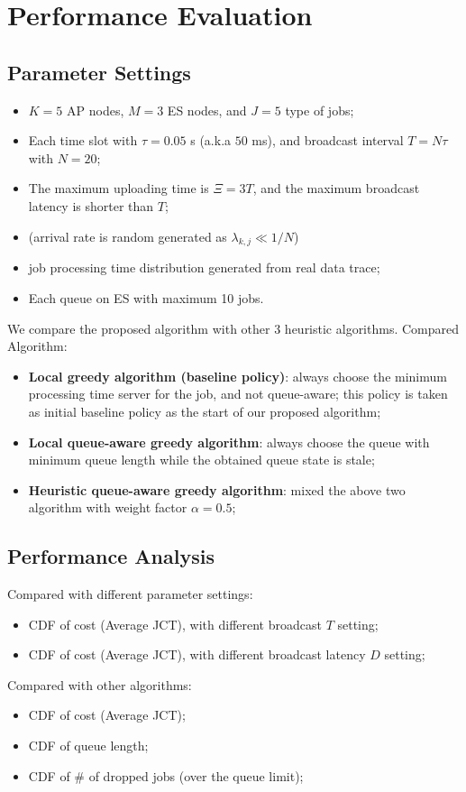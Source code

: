 \section{Performance Evaluation}

\subsection{Parameter Settings}
\begin{itemize}
    \item $K=5$ AP nodes, $M=3$ ES nodes, and $J=5$ type of jobs;
    \item Each time slot with $\tau=0.05$ s (a.k.a $50$ ms), and broadcast interval $T=N\tau$ with $N=20$;
    \item The maximum uploading time is $\Xi = 3 T$, and the maximum broadcast latency is shorter than $T$;
    \item (arrival rate is random generated as $\lambda_{k,j} \ll 1/N$)
    \item job processing time distribution generated from real data trace;
    \item Each queue on ES with maximum 10 jobs.
\end{itemize}

We compare the proposed algorithm with other 3 heuristic algorithms.
Compared Algorithm:
\begin{itemize}
    \item \textbf{Local greedy algorithm (baseline policy)}:
            always choose the minimum processing time server for the job, and not queue-aware; this policy is taken as initial baseline policy as the start of our proposed algorithm;
    \item \textbf{Local queue-aware greedy algorithm}:
            always choose the queue with minimum queue length while the obtained queue state is stale;
    \item \textbf{Heuristic queue-aware greedy algorithm}:
            mixed the above two algorithm with weight factor $\alpha = 0.5$;
\end{itemize}

\subsection{Performance Analysis}
Compared with different parameter settings:
\begin{itemize}
    \item CDF of cost (Average JCT), with different broadcast $T$ setting;
    \item CDF of cost (Average JCT), with different broadcast latency $D$ setting;
\end{itemize}

Compared with other algorithms:
\begin{itemize}
    \item CDF of cost (Average JCT);
    \item CDF of queue length;
    \item CDF of \# of dropped jobs (over the queue limit);
\end{itemize}